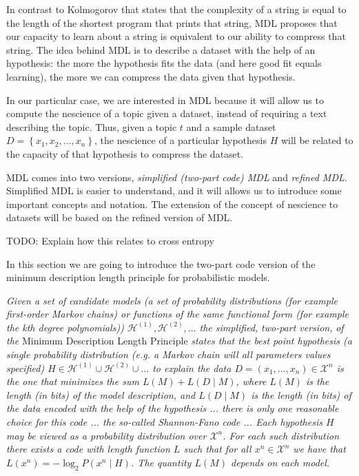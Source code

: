 {In contrast to Kolmogorov that states that the complexity of a string
is equal to the length of the shortest program that prints that string,
MDL proposes that our capacity to learn about a string is equivalent
to our ability to compress that string. The idea behind MDL is to
describe a dataset with the help of an hypothesis: the more the hypothesis
fits the data (and here good fit equals learning), the more we can
compress the data given that hypothesis.

In our particular case, we are interested in MDL because it will allow
us to compute the nescience of a topic given a dataset, instead of
requiring a text describing the topic. Thus, given a topic $t$ and
a sample dataset $D=\left\{ x_{1},x_{2},\ldots,x_{n}\right\} $, the
nescience of a particular hypothesis $H$ will be related to the capacity
of that hypothesis to compress the dataset.

MDL comes into two versions, \emph{simplified (two-part code) MDL}
and \emph{refined MDL}. Simplified MDL is easier to understand, and
it will allows us to introduce some important concepts and notation.
The extension of the concept of nescience to datasets will be based
on the refined version of MDL.


{\color{red} TODO: Explain how this relates to cross entropy}


In this section we are going to introduce the two-part code version
of the minimum description length principle for probabilistic models.

\emph{Given a set of candidate models (a set of probability distributions
(for example first-order Markov chains) or functions of the same functional
form (for example the kth degree polynomials)) $\mathcal{H^{\left(\text{1}\right)}},\mathcal{H}^{\left(2\right)},\ldots$
the simplified,} \emph{two-part version,} \emph{of the} Minimum Description
Length Principle \cite{Gr=0000FC05}\emph{ states that the best point
hypothesis (a single probability distribution (e.g. a Markov chain
will all parameters values specified) $H\in\mathcal{H^{\left(\text{1}\right)}}\cup\mathcal{H}^{\left(2\right)}\cup\ldots$
to explain the data $D=\left(x_{1},\ldots,x_{n}\right)\in\mathcal{X}^{n}$
is the one that minimizes the sum $L(M)+L(D\mid M)$, where $L(M)$
is the length (in bits) of the model description, and $L(D\mid M)$
is the length (in bits) of the data encoded with the help of the hypothesis
... there is only one reasonable choice for this code ... the so-called
Shannon-Fano code ... Each hypothesis $H$ may be viewed as a probability
distribution over $\mathcal{X}^{n}$. For each such distribution there
exists a code with length function $L$ such that for all $x^{n}\in\mathcal{X}^{n}$
we have that $L\left(x^{n}\right)=-\log_{2}P\left(x^{n}\mid H\right)$.
The quantity $L(M)$ depends on each model.}

}

